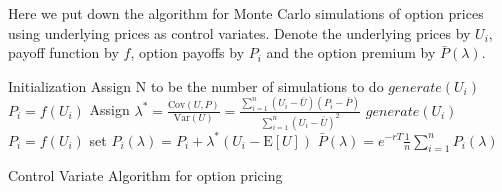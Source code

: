 Here we put down the algorithm for Monte Carlo simulations of option prices using underlying prices as control variates. Denote the underlying prices by $U_{i}$, payoff function by $f$, option payoffs by $P_{i}$ and the option premium by $\bar{P}(\lambda)$.\\[5mm]
\begin{algorithm}[H]
 Initialization\;
 Assign N to be the number of simulations to do\;
  {
  \quad $generate(U_{i})$\;
  \quad $P_{i} = f(U_{i})$\;
 }
 Assign $\lambda^{*} = \frac{\mathrm{Cov}(U, P)}{\mathrm{Var}(U)} = \frac{\sum_{i=1}^{n}(U_{i}-\bar{U})(P_{i}-\bar{P})}{\sum_{i=1}^{n}(U_{i}-\bar{U})^{2}}$\;
  {
  \quad $generate(U_{i})$\;
  \quad $P_{i} = f(U_{i})$\;
  \quad set ${P}_{i}(\lambda) = P_{i} + \lambda^{*}(U_{i}-\mathrm{E}[U])$\;
 }
 $\bar{P}(\lambda) = e^{-rT}\frac{1}{n} \sum_{i=1}^{n} {P}_{i}(\lambda)$\;
\caption{Control Variate Algorithm for option pricing}
\end{algorithm}
\newpage
